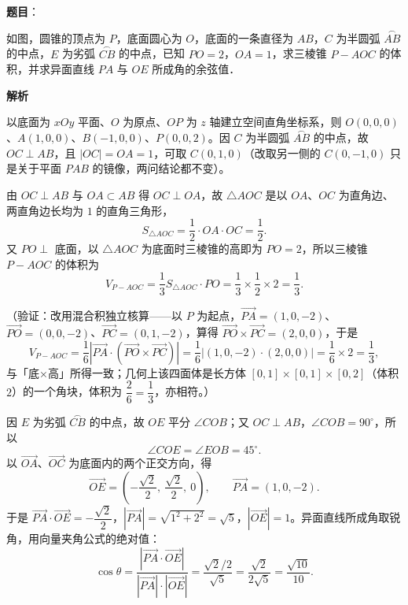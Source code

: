 \begin{answer}

\textbf{题目}：

如图，圆锥的顶点为 \(P\)，底面圆心为 \(O\)，底面的一条直径为 \(AB\)，\(C\) 为半圆弧 \(\overset{\frown}{AB}\) 的中点，\(E\) 为劣弧 \(\overset{\frown}{CB}\) 的中点，已知 \(PO=2\)，\(OA=1\)，求三棱锥 \(P-AOC\) 的体积，并求异面直线 \(PA\) 与 \(OE\) 所成角的余弦值．
\nopagebreak[4]
\begin{center}\end{center}
\nopagebreak[4]
\textbf{解析}

以底面为 \(xOy\) 平面、\(O\) 为原点、\(OP\) 为 \(z\) 轴建立空间直角坐标系，则 \(O(0,0,0)\)、\(A(1,0,0)\)、\(B(-1,0,0)\)、\(P(0,0,2)\)。因 \(C\) 为半圆弧 \(\overset{\frown}{AB}\) 的中点，故 \(OC\perp AB\)，且 \(|OC|=OA=1\)，可取 \(C(0,1,0)\)（改取另一侧的 \(C(0,-1,0)\) 只是关于平面 \(PAB\) 的镜像，两问结论都不变）。

由 \(OC\perp AB\) 与 \(OA\subset AB\) 得 \(OC\perp OA\)，故 \(\triangle AOC\) 是以 \(OA\)、\(OC\) 为直角边、两直角边长均为 \(1\) 的直角三角形，
\nopagebreak[4]
\[
S_{\triangle AOC}=\frac{1}{2}\cdot OA\cdot OC=\frac{1}{2}.
\]
又 \(PO\perp\) 底面，以 \(\triangle AOC\) 为底面时三棱锥的高即为 \(PO=2\)，所以三棱锥 \(P-AOC\) 的体积为
\nopagebreak[4]
\[
V_{P-AOC}=\frac{1}{3}S_{\triangle AOC}\cdot PO=\frac{1}{3}\times\frac{1}{2}\times2=\frac{1}{3}.
\]

（验证：改用混合积独立核算——以 \(P\) 为起点，\(\overrightarrow{PA}=(1,0,-2)\)、\(\overrightarrow{PO}=(0,0,-2)\)、\(\overrightarrow{PC}=(0,1,-2)\)，算得 \(\overrightarrow{PO}\times\overrightarrow{PC}=(2,0,0)\)，于是
\nopagebreak[4]
\[
V_{P-AOC}=\frac{1}{6}\left|\overrightarrow{PA}\cdot(\overrightarrow{PO}\times\overrightarrow{PC})\right|=\frac{1}{6}\left|(1,0,-2)\cdot(2,0,0)\right|=\frac{1}{6}\times2=\frac{1}{3},
\]
与「底×高」所得一致；几何上该四面体是长方体 \([0,1]\times[0,1]\times[0,2]\)（体积 \(2\)）的一个角块，体积为 \(\dfrac{2}{6}=\dfrac{1}{3}\)，亦相符。）

因 \(E\) 为劣弧 \(\overset{\frown}{CB}\) 的中点，故 \(OE\) 平分 \(\angle COB\)；又 \(OC\perp AB\)，\(\angle COB=90^{\circ}\)，所以
\nopagebreak[4]
\[
\angle COE=\angle EOB=45^{\circ}.
\]
以 \(\overrightarrow{OA}\)、\(\overrightarrow{OC}\) 为底面内的两个正交方向，得
\nopagebreak[4]
\[
\overrightarrow{OE}=\left(-\frac{\sqrt2}{2},\ \frac{\sqrt2}{2},\ 0\right),\qquad \overrightarrow{PA}=(1,0,-2).
\]
于是 \(\overrightarrow{PA}\cdot\overrightarrow{OE}=-\dfrac{\sqrt2}{2}\)，\(|\overrightarrow{PA}|=\sqrt{1^{2}+2^{2}}=\sqrt5\)，\(|\overrightarrow{OE}|=1\)。异面直线所成角取锐角，用向量夹角公式的绝对值：
\nopagebreak[4]
\[
\cos\theta=\frac{\left|\overrightarrow{PA}\cdot\overrightarrow{OE}\right|}{|\overrightarrow{PA}|\cdot|\overrightarrow{OE}|}=\frac{\sqrt2/2}{\sqrt5}=\frac{\sqrt2}{2\sqrt5}=\frac{\sqrt{10}}{10}.
\]


\end{answer}
